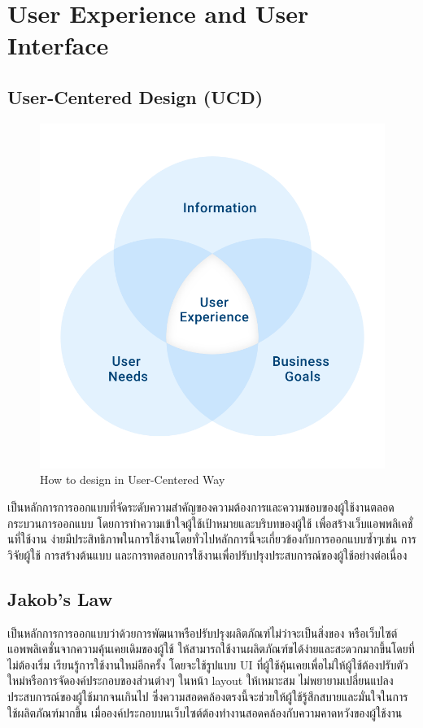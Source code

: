 \section{User Experience and User Interface}
  \subsection{User-Centered Design (UCD)}
    \begin{figure}[h!]
      \begin{center}
        \includegraphics[scale=0.25]{image/Background/UDC.png}
      \end{center}
      \caption[User-Centered Design]{How to design in User-Centered Way}
      \label{fig:udc_pic}
    \end{figure}
    \FloatBarrier
    \qquad เป็นหลักการการออกแบบที่จัดระดับความสําคัญของความต้องการและความชอบของผู้ใช้งานตลอดกระบวนการออกแบบ โดยการทําความเข้าใจผู้ใช้เป้าหมายและบริบทของผู้ใช้ เพื่อสร้างเว็บแอพพลิเคชั่นที่ใช้งาน ง่ายมีประสิทธิภาพในการใช้งานโดยทั่วไปหลักการนี้จะเกี่ยวข้องกับการออกแบบซํ้าๆเช่น การวิจัยผู้ใช้ การสร้างต้นแบบ และการทดสอบการใช้งานเพื่อปรับปรุงประสบการณ์ของผู้ใช้อย่างต่อเนื่อง \cite{UCD1}\cite{UCD2}

  \subsection{Jakob’s Law}
    \qquad เป็นหลักการการออกแบบว่าด้วยการพัฒนาหรือปรับปรุงผลิตภัณฑ์ไม่ว่าจะเป็นสิ่งของ หรือเว็บไซต์ แอพพลิเคชั่นจากความคุ้นเคยเดิมของผู้ใช้ ให้สามารถใช้งานผลิตภัณฑ์ขได้ง่ายและสะดวกมากขึ้นโดยที่ไม่ต้องเริ่ม เรียนรู้การใช้งานใหม่อีกครั้ง โดยจะใช้รูปแบบ UI ที่ผู้ใช้คุ้นเคยเพื่อไม่ให้ผู้ใช้ต้องปรับตัวใหม่หรือการจัดองค์ประกอบของส่วนต่างๆ ในหน้า layout ให้เหมาะสม ไม่พยายามเปลี่ยนแปลงประสบการณ์ของผู้ใช้มากจนเกินไป ซึ่งความสอดคล้องตรงนี้จะช่วยให้ผู้ใช้รู้สึกสบายและมั่นใจในการใช้ผลิตภัณฑ์มากขึ้น เมื่อองค์ประกอบบนเว็บไซต์ต้องทํางานสอดคล้องกับความคาดหวังของผู้ใช้งาน \cite{Jakob}

